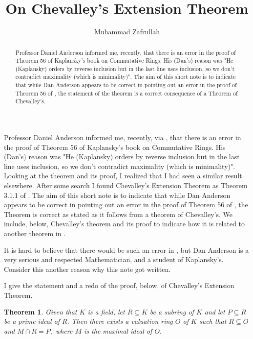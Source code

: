 \documentclass{amsproc}
\theoremstyle{plain}
\newtheorem{theorem}{Theorem}
\numberwithin{equation}{section}
\begin{document}
\title{On Chevalley's Extension Theorem}
\author{Muhammad Zafrullah}
\address{Department of Mathematics, Idaho State University, Pocatello, 83209
ID}
\urladdr{}

\begin{abstract}
Professor Daniel Anderson informed me, recently, that there is an error in
the proof of Theorem 56 of Kaplansky's book on Commutative Rings. His
(Dan's) reason was "He (Kaplansky) orders by reverse inclusion but in the
last line uses inclusion, so we don't contradict maximality (which is
minimality)". The aim of this short note is to indicate that while Dan
Anderson appears to be correct in pointing out an error in the proof of
Theorem 56 of \cite{K}, the statement of the theorem is a correct
consequence of a Theorem of Chevalley's.
\end{abstract}

\maketitle

\bigskip Professor Daniel Anderson informed me, recently, via \cite{A}, that
there is an error in the proof of Theorem 56 of Kaplansky's book on
Commutative Rings. His (Dan's) reason was "He (Kaplansky) orders by reverse
inclusion but in the last line uses inclusion, so we don't contradict
maximality (which is minimality)". Looking at the theorem and its proof, I
realized that I had seen a similar result elsewhere. After some search I
found Chevalley's Extension Theorem as Theorem 3.1.1 of \cite{EP}. The aim
of this short note is to indicate that while Dan Anderson appears to be
correct in pointing out an error in the proof of Theorem 56 of \cite{K}, the
Theorem is correct as stated as it follows from a theorem of Chevalley's. We
include, below, Chevalley's theorem and its proof to indicate how it is
related to another theorem in \cite{K}.

It is hard to believe that there would be such an error in \cite{K}, but Dan
Anderson is a very serious and respected Mathematician, and a student of
Kaplansky's. Consider this another reason why this note got written.

I give the statement and a redo of the proof, below, of Chevalley's
Extension Theorem.

\begin{theorem}
\label{Theorem A}Given that $K$ is a field, let $R\subseteq K$ be a subring
of $K$ and let $P\subseteq R$ be a prime ideal of $R.$ Then there exists a
valuation ring $O$ of $K$ such that $R\subseteq O$ and $M\cap R=P,$ where $M$
is the maximal ideal of $O.$
\end{theorem}
\end{document}
